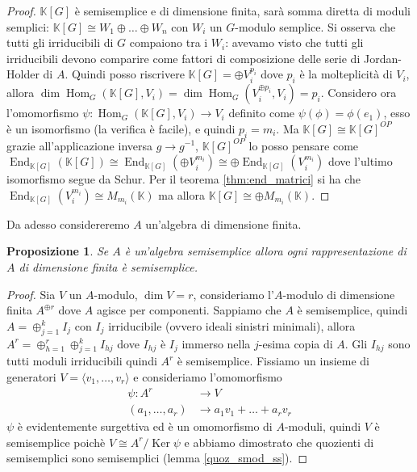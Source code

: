 \documentclass[11pt]{article}
\theoremstyle{plain}
\newtheorem{prop}[thm]{Proposizione}
\theoremstyle{definition}
\theoremstyle{remark}
\newcommand{\K}{\mathbb{K}}
\DeclareMathOperator{\Hom}{Hom}
\DeclareMathOperator{\End}{End}
\DeclareMathOperator{\Ker}{Ker}
\begin{document}
\begin{proof}
	$\K[G]$ è semisemplice e di dimensione finita, sarà somma diretta di moduli semplici: $\K[G]\cong W_1\oplus \ldots\oplus W_n$ con $W_i$ un $G$-modulo semplice. Si osserva che tutti gli irriducibili di $G$ compaiono tra i $W_i$: avevamo visto che tutti gli irriducibili devono comparire come fattori di composizione delle serie di Jordan-Holder di $A$. Quindi posso riscrivere $\K[G] = \oplus V_i^{p_i}$ dove $p_i$ è la molteplicità di $V_i$, allora $\dim \Hom_G(\K[G],V_i) = \dim\Hom_G(V_i^{\oplus p_i},V_i) = p_i$. Considero ora l'omomorfismo $\psi:\Hom_G(\K[G],V_i)\to V_i$ definito come $\psi(\phi) = \phi(e_1)$, esso è un isomorfismo (la verifica è facile), e quindi $p_i = m_i$. Ma $\K[G]\cong \K[G]^{OP}$ grazie all'applicazione inversa $g\to g^{-1}$, $\K[G]^{OP}$ lo posso pensare come $\End_{\K[G]}(\K[G]) \cong \End_{\K[G]}(\oplus V_i^{m_i}) \cong \oplus\End_{\K[G]}(V_i^{m_i})$ dove l'ultimo isomorfismo segue da Schur. Per il teorema \ref{thm:end_matrici} si ha che $\End_{\K[G]}(V_i^{m_i}) \cong M_{m_i}(\K)$ ma allora $\K[G] \cong \oplus M_{m_i}(\K)$.
\end{proof}

Da adesso considereremo $A$ un'algebra di dimensione finita.
\begin{prop}
	Se $A$ è un'algebra semisemplice allora ogni rappresentazione di $A$ di dimensione finita è semisemplice.
\end{prop}


\begin{proof}
	Sia $V$ un $A$-modulo, $\dim V = r$, consideriamo l'$A$-modulo di dimensione finita $A^{\oplus r}$ dove $A$ agisce per componenti. Sappiamo che $A$ è semisemplice, quindi $A=\oplus_{j=1}^{k} I_j$ con $I_j$ irriducibile (ovvero ideali sinistri minimali), allora $A^r=\oplus_{h=1}^{r}\oplus_{j=1}^{k} I_{hj}$ dove $I_{hj}$ è $I_j$ immerso nella $j$-esima copia di $A$. Gli $I_{hj}$ sono tutti moduli irriducibili quindi $A^r$ è semisemplice. Fissiamo un insieme di generatori $V=\langle v_1,\ldots,v_r\rangle$ e consideriamo l'omomorfismo
	\begin{align*}
		\psi:A^r&\to V\\
		(a_1,\ldots,a_r)&\to a_1v_1+\ldots+a_rv_r
	\end{align*}
	$\psi$ è evidentemente surgettiva ed è un omomorfismo di $A$-moduli, quindi $V$ è semisemplice poichè $V\cong A^r/\Ker \psi$ e abbiamo dimostrato che quozienti di semisemplici sono semisemplici (lemma \ref{quoz_smod_ss}).
\end{proof}
\end{document}
